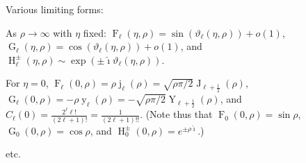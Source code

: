 \documentclass[10pt,dvipdfmx,letterpaper,twoside]{article}
\let\O=\operatorname
\newcommand{\ii}{{\hat{\imath}}}
\let\theta=\vartheta
\begin{document}
Various limiting forms:

As $\rho\to\infty$ with $\eta$ fixed:
$\O{F}_\ell(\eta,\rho) = \sin( \theta_\ell(\eta,\rho) ) + o(1)$,
$\O{G}_\ell(\eta,\rho) = \cos( \theta_\ell(\eta,\rho) ) + o(1)$, and
$\O{H}^\pm_\ell(\eta,\rho) \sim \exp( \pm\ii\theta_\ell(\eta,\rho) )$.

For $\eta=0$,
$\O{F}_\ell(0,\rho) = \rho \O{j}_\ell(\rho) = \sqrt{\rho\pi/2} \O{J}_{\ell+\tfrac12}(\rho)$,
$\O{G}_\ell(0,\rho) = -\rho \O{y}_\ell(\rho) = -\sqrt{\rho\pi/2} \O{Y}_{\ell+\tfrac12}(\rho)$, and
$C_\ell(0) = \frac{2^\ell \ell!}{(2\ell+1)!} = \frac{1}{(2\ell+1)!!}$.
(Note thus that $\O{F}_0(0,\rho) = \sin\rho$, $\O{G}_0(0,\rho) = \cos\rho$, and $\O{H}^\pm_0(0,\rho)=e^{\pm\rho\ii}$.)

etc.

\end{document}
